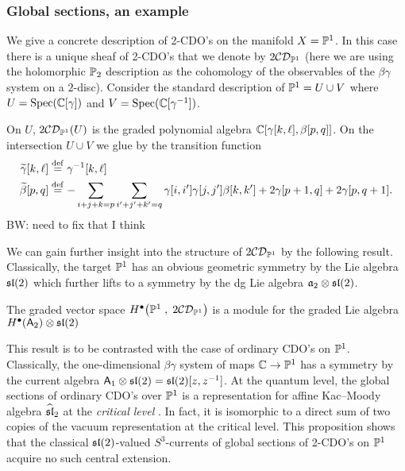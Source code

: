 \documentclass[11pt]{amsart}
\def\CDO{{\cC\cD}}
\def\brian#1{{\textcolor{blue!65!red}{BW: {#1}}}}
\begin{document}
\subsubsection{Global sections, an example}

We give a concrete description of 2-CDO's on the manifold $X = \PP^1$.
In this case there is a unique sheaf of 2-CDO's that we denote by $2\CDO_{\PP^1}$ (here we are using the holomorphic $\PP_2$ description as the cohomology of the observables of the $\beta\gamma$ system on a $2$-disc).
Consider the standard description of $\PP^1 = U \cup V$ where $U = {\rm Spec}(\CC[\gamma])$ and $V = {\rm Spec}(\CC[\gamma^{-1}])$. 

On $U$, $2\CDO_{\PP^1}(U)$ is the graded polynomial algebra $\CC[\gamma[k,\ell], \beta[p,q]]$. 
On the intersection $U \cup V$ we glue by the transition function
\begin{align*}
\Tilde{\gamma} [k,\ell] & \define \gamma^{-1} [k,\ell] \\
\Tilde{\beta} [p,q] & \define - \sum_{i+j+k=p} \sum_{i'+j'+k'=q} \gamma[i,i'] \gamma[j,j'] \beta[k,k'] + 2 \gamma[p+1, q] + 2 \gamma[p, q+1] .
\end{align*}
\brian{need to fix that I think}

We can gain further insight into the structure of $2\CDO_{\PP^1}$ by the following result. 
Classically, the target $\PP^1$ has an obvious geometric symmetry by the Lie algebra $\sl(2)$ which further lifts to a symmetry by the dg Lie algebra $\fa_2 \otimes \sl(2)$. 

\begin{prop}
The graded vector space $H^\bu \big(\PP^1 \; , \; 2 \CDO_{\PP^1}\big)$ is a module for the graded Lie algebra $H^\bu(\sfA_2) \otimes \sl(2)$
\end{prop}

\begin{rmk}
This result is to be contrasted with the case of ordinary CDO's on $\PP^1$. 
Classically, the one-dimensional $\beta\gamma$ system of maps $\CC \to \PP^1$ has a symmetry by the current algebra $\sfA_1 \otimes \sl(2) = \sl(2)[z,z^{-1}]$. 
At the quantum level, the global sections of ordinary CDO's over $\PP^1$ is a representation for affine Kac--Moody algebra $\Hat{\sl}_2$ at the {\em critical level} \cite[Theorem 5.7]{MSV}. 
In fact, it is isomorphic to a direct sum of two copies of the vacuum representation at the critical level.
This proposition shows that the classical $\sl(2)$-valued $S^3$-currents of global sections of 2-CDO's on $\PP^1$ acquire no such central extension. 
\end{rmk}
\end{document}
